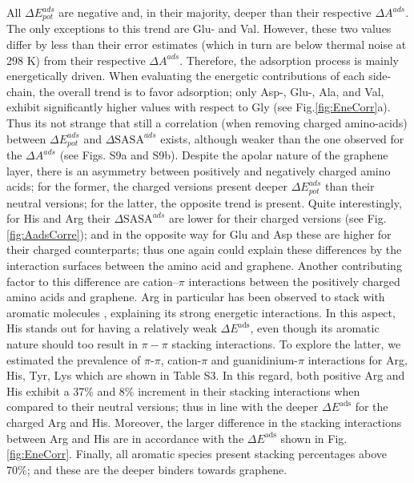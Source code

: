 \documentclass[journal=jcisd8,manuscript=article,layout=twocolumn]{achemso}
\begin{document}
All $\Delta E_{pot}^{ads}$ are negative and, in their majority, deeper than their respective $\Delta A^{ads}$.
The only exceptions to this trend are Glu- and Val.
However, these two values differ by less than their error estimates (which in turn are below thermal noise at 298 K) from their respective $\Delta A^{ads}$.
Therefore, the adsorption process is mainly energetically driven.
When evaluating the energetic contributions of each side-chain, the overall trend is to favor adsorption; only Asp-, Glu-, Ala, and Val, exhibit significantly higher values with respect to Gly (see Fig.\ref{fig:EneCorr}a).
Thus its not strange that still a correlation (when removing charged amino-acids) between $\Delta E^{ads}_{pot}$ and $\Delta \textrm{SASA}^{ads}$ exists, although weaker than the one observed for the $\Delta A^{ads}$ (see Figs. S9a and S9b).
Despite the apolar nature of the graphene layer, there is an asymmetry between positively and negatively charged amino acids; for the former, the charged versions present deeper $\Delta E_{pot}^{ads}$ than their neutral versions; for the latter, the opposite trend is present.
Quite interestingly, for His and Arg their $\Delta \textrm{SASA}^{ads}$ are lower for their charged versions (see Fig.\ref{fig:AadsCorre}); and in the opposite way for Glu and Asp these are higher for their charged counterparts; thus one again could explain these differences by the interaction surfaces between the amino acid and graphene. Another contributing factor to this difference are cation--$\pi$ interactions between the positively charged amino acids and graphene. Arg in particular has been observed to stack with aromatic molecules \cite{Flocco_1994}, explaining its strong energetic interactions.
In this aspect, His stands out for having a relatively weak $\Delta E^{\textrm{ads}}$, even though its aromatic nature should too result in $\pi-\pi$ stacking interactions.
To explore the latter, we estimated the prevalence of $\pi$-$\pi$, cation-$\pi$ and guanidinium-$\pi$ interactions for Arg, His, Tyr, Lys  which are shown in Table S3. In this regard, both positive Arg and His exhibit a 37\% and 8\% increment in their stacking interactions when compared to their neutral versions; thus in line with the deeper $\Delta E^{\textrm{ads}}$ for the charged Arg and His.
Moreover, the larger difference in the stacking interactions between Arg and His are in accordance with the $\Delta E^{\textrm{ads}}$ shown in Fig.\ref{fig:EneCorr}. Finally, all aromatic species present stacking percentages above 70\%; and these are the deeper binders towards graphene.
\end{document}
